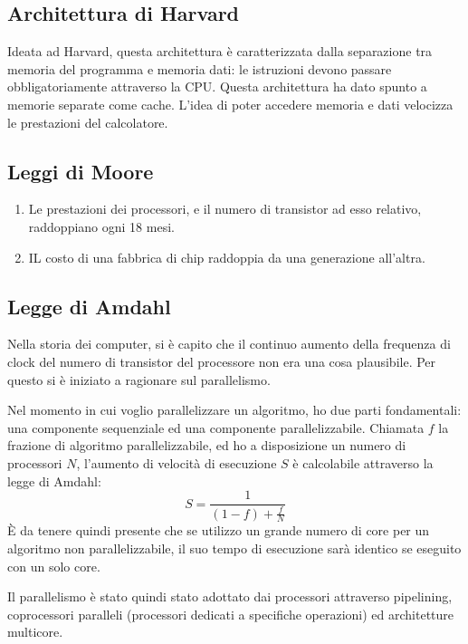 \documentclass[../ace.tex]{subfiles}
\begin{document}
\subsection{Architettura di Harvard} \label{sec:architettura_harvard}
\begin{figure}[h]
    \centering
\end{figure}

\noindent
Ideata ad Harvard, questa architettura è caratterizzata dalla separazione tra memoria del programma e memoria dati: le istruzioni
devono passare obbligatoriamente attraverso la CPU.
Questa architettura ha dato spunto a memorie separate come cache.
L'idea di poter accedere memoria e dati velocizza le prestazioni del calcolatore.

\subsection{Leggi di Moore}
\begin{enumerate}
    \item Le prestazioni dei processori, e il numero di transistor ad esso relativo, raddoppiano ogni 18 mesi.
    \item IL costo di una fabbrica di chip raddoppia da una generazione all'altra.
\end{enumerate}

\subsection{Legge di Amdahl}
Nella storia dei computer, si è capito che il continuo aumento della frequenza di clock del numero di transistor del processore
non era una cosa plausibile. Per questo si è iniziato a ragionare sul parallelismo.

Nel momento in cui voglio parallelizzare un algoritmo, ho due parti fondamentali: una componente sequenziale ed una componente
parallelizzabile.
Chiamata $f$ la frazione di algoritmo parallelizzabile, ed ho a disposizione un numero di processori $N$, l'aumento di
velocità di esecuzione $S$ è calcolabile attraverso la legge di Amdahl:
\[
    S = \frac{1}{(1 - f) + \frac{f}{N}}
\]
È da tenere quindi presente che se utilizzo un grande numero di core per un algoritmo non parallelizzabile, il suo tempo di
esecuzione sarà identico se eseguito con un solo core.

Il parallelismo è stato quindi stato adottato dai processori attraverso pipelining, coprocessori paralleli (processori dedicati
a specifiche operazioni) ed architetture multicore.
\end{document}
